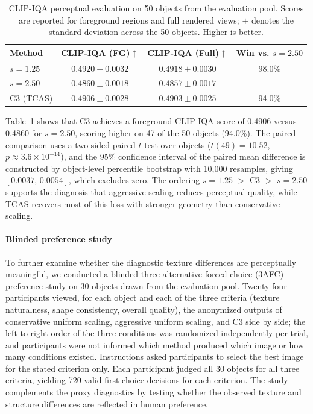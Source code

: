 \documentclass[times,twocolumn,final]{elsarticle}
\begin{document}
\begin{table}[t]
\centering
\caption{CLIP-IQA perceptual evaluation on 50 objects from the evaluation pool. Scores are reported for foreground regions and full rendered views; $\pm$ denotes the standard deviation across the 50 objects. Higher is better.}
\label{tab:clipiqa}
\footnotesize\setlength{\tabcolsep}{4pt}
\begin{tabular}{lccc}
\toprule
Method & CLIP-IQA (FG)$\uparrow$ & CLIP-IQA (Full)$\uparrow$ & Win vs. $s=2.50$ \\
\midrule
$s = 1.25$ & $\mathbf{0.4920 \pm 0.0032}$ & $\mathbf{0.4918 \pm 0.0030}$ & $\mathbf{98.0\%}$ \\
$s = 2.50$ & $0.4860 \pm 0.0018$ & $0.4857 \pm 0.0017$ & -- \\
C3 (TCAS) & $0.4906 \pm 0.0028$ & $0.4903 \pm 0.0025$ & 94.0\% \\
\bottomrule
\end{tabular}
\end{table}

Table~\ref{tab:clipiqa} shows that C3 achieves a foreground CLIP-IQA score of 0.4906 versus 0.4860 for $s = 2.50$, scoring higher on 47 of the 50 objects (94.0\%). The paired comparison uses a two-sided paired $t$-test over objects ($t(49)=10.52$, $p\approx3.6\times10^{-14}$), and the 95\% confidence interval of the paired mean difference is constructed by object-level percentile bootstrap with 10{,}000 resamples, giving $[0.0037,\,0.0054]$, which excludes zero. The ordering $s = 1.25$ $>$ C3 $>$ $s = 2.50$ supports the diagnosis that aggressive scaling reduces perceptual quality, while TCAS recovers most of this loss with stronger geometry than conservative scaling.

\paragraph{Blinded preference study}
To further examine whether the diagnostic texture differences are perceptually meaningful, we conducted a blinded three-alternative forced-choice (3AFC) preference study on 30 objects drawn from the evaluation pool. Twenty-four participants viewed, for each object and each of the three criteria (texture naturalness, shape consistency, overall quality), the anonymized outputs of conservative uniform scaling, aggressive uniform scaling, and C3 side by side; the left-to-right order of the three conditions was randomized independently per trial, and participants were not informed which method produced which image or how many conditions existed. Instructions asked participants to select the best image for the stated criterion only. Each participant judged all 30 objects for all three criteria, yielding 720 valid first-choice decisions for each criterion. The study complements the proxy diagnostics by testing whether the observed texture and structure differences are reflected in human preference.
\end{document}
